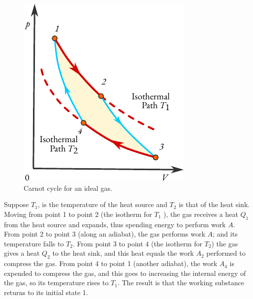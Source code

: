 \begin{figure}%
\centering
\includegraphics[width=\textwidth]{figures/carnot.pdf}
\caption{Carnot cycle for an ideal gas.\label{ideal-gas}}
\end{figure}

Suppose $T_{1}$, is the temperature of the heat source and $T_{2}$ is that of the heat sink. Moving from point 1 to point 2 (the isotherm for $T_{1}$ ), the gas receives a heat $Q_{1}$ from the heat source and expands, thus spending energy to perform work $A$. From point 2 to point 3 (along an adiabat), the gas performs work $A$; and its temperature falls to $T_{2}$. From point 3 to point 4 (the isotherm for $T_{2}$) the gas gives a heat $Q_{2}$ to the heat sink, and this heat equals the work $A_{2}$ performed to compress the gas. From point 4 to point 1 (another adiabat), the work $A_{4}$ is expended to compress the gas, and this goes to increasing the internal energy of the gas, so its temperature rises to $T_{1}$. The result is that the working substance returns to its initial state 1. 

